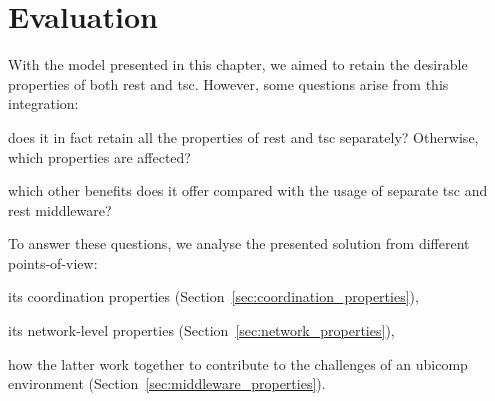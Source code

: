 \section{Evaluation}
\label{sec:middleware_qualitative_evaluation}

With the model presented in this chapter, we aimed to retain the desirable properties of both \ac{rest} and \ac{tsc}. %
However, some questions arise from this integration:
\begin{enumerate*}[label=\itshape(\arabic*\upshape)]
  \item does it in fact retain all the properties of \ac{rest} and \ac{tsc} separately? Otherwise, which properties are affected?
  \item which other benefits does it offer compared with the usage of separate \ac{tsc} and \ac{rest} middleware?
\end{enumerate*}



To answer these questions, we analyse the presented solution from different points-of-view:
\begin{enumerate*}[label=\itshape(\arabic*\upshape)]
  \item its coordination properties (Section~\ref{sec:coordination_properties}),
  \item its network-level properties (Section~\ref{sec:network_properties}),
  \item how the latter work together to contribute to the challenges of an \ac{ubicomp} environment (Section~\ref{sec:middleware_properties}).
\end{enumerate*}




